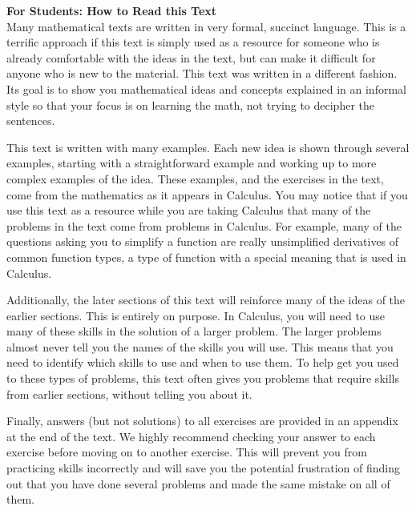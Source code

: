 
\noindent\textbf{\large For Students: How to Read this Text}\\

Many mathematical texts are written in very formal, succinct language. This is a terrific approach if this text is simply used as a resource for someone who is already comfortable with the ideas in the text, but can make it difficult for anyone who is new to the material. This text was written in a different fashion. Its goal is to show you mathematical ideas and concepts explained in an informal style so that your focus is on learning the math, not trying to decipher the sentences.

This text is written with many examples. Each new idea is shown through several examples, starting with a straightforward example and working up to more complex examples of the idea. These examples, and the exercises in the text, come from the mathematics as it appears in Calculus. You may notice that if you use this text as a resource while you are taking Calculus that many of the problems in the text come from problems in Calculus. For example, many of the questions asking you to simplify a function are really unsimplified derivatives of common function types, a type of function with a special meaning that is used in Calculus. 

Additionally, the later sections of this text will reinforce many of the ideas of the earlier sections. This is entirely on purpose. In Calculus, you will need to use many of these skills in the solution of a larger problem. The larger problems almost never tell you the names of the skills you will use. This means that you need to identify which skills to use and when to use them. To help get you used to these types of problems, this text often gives you problems that require skills from earlier sections, without telling you about it.

Finally, answers (but not solutions) to all exercises are provided in an appendix at the end of the text. We highly recommend checking your answer to each exercise before moving on to another exercise. This will prevent you from practicing skills incorrectly and will save you the potential frustration of finding out that you have done several problems and made the same mistake on all of them. \\

